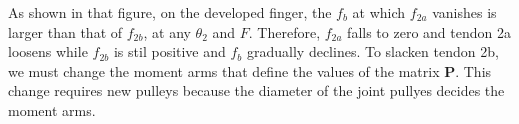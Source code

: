 \documentclass{llncs}
\begin{document}
As shown in that figure, on the developed finger, the $f_b$ at which $f_{2a}$ vanishes is larger than that of $f_{2b}$, at any $\theta_2$ and $F$.
Therefore, $f_{2a}$ falls to zero and tendon 2a loosens while $f_{2b}$ is stil positive and $f_b$ gradually declines.
To slacken tendon 2b, we must change the moment arms that define the values of the matrix $\bm{P}$.
This change requires new pulleys because the diameter of the joint pullyes decides the moment arms.
			
\end{document}
